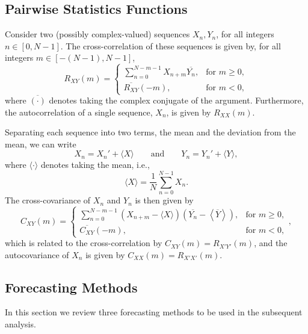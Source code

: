 \documentclass[11pt, oneside]{article}
\begin{document}
\subsection{Pairwise Statistics Functions}
Consider two (possibly complex-valued) sequences $X_n,Y_n$, for all integers $n \in [0,N-1]$.
The cross-correlation of these sequences is given by, for all integers $m \in [-(N-1),N-1]$,
\begin{equation}
R_{XY}(m) =
\begin{cases}
\displaystyle \sum_{n=0}^{N-m-1} X_{n+m} \overline{Y_n}, & \text{for } m \geq 0,\\[20pt]
\overline{R_{XY}}(-m), & \text{for } m < 0,
\end{cases}
\end{equation}
where $\overline{(\cdot)}$ denotes taking the complex conjugate of the argument.
Furthermore, the autocorrelation of a single sequence, $X_n$, is given by $R_{XX}(m)$.

Separating each sequence into two terms, the mean and the deviation from the mean, we can write
\begin{equation}
X_n = X_n' + \langle X \rangle
\quad\quad \text{and} \quad\quad
Y_n = Y_n' + \langle Y \rangle,
\end{equation}
where $\langle \cdot \rangle$ denotes taking the mean, i.e.,
\begin{equation}
\langle X \rangle = \frac{1}{N} \sum_{n = 0}^{N-1} X_n.
\end{equation}
The cross-covariance of $X_n$ and $Y_n$ is then given by
\begin{equation}
C_{XY}(m) = 
\begin{cases}
\displaystyle \sum_{n=0}^{N-m-1} \left( X_{n+m} - \langle X \rangle \right) \left( \overline{Y_n} - \left\langle \overline{Y} \right\rangle \right), & \text{for } m \geq 0,\\[20pt]
\overline{C_{XY}}(-m), & \text{for } m < 0,
\end{cases},
\end{equation}
which is related to the cross-correlation by $C_{XY}(m) = R_{X'Y'}(m)$, and the autocovariance of $X_n$ is given by $C_{XX}(m) = R_{X'X'}(m)$.

\subsection{Forecasting Methods}\label{sec:Methods}
In this section we review three forecasting methods to be used in the subsequent analysis.
\end{document}

